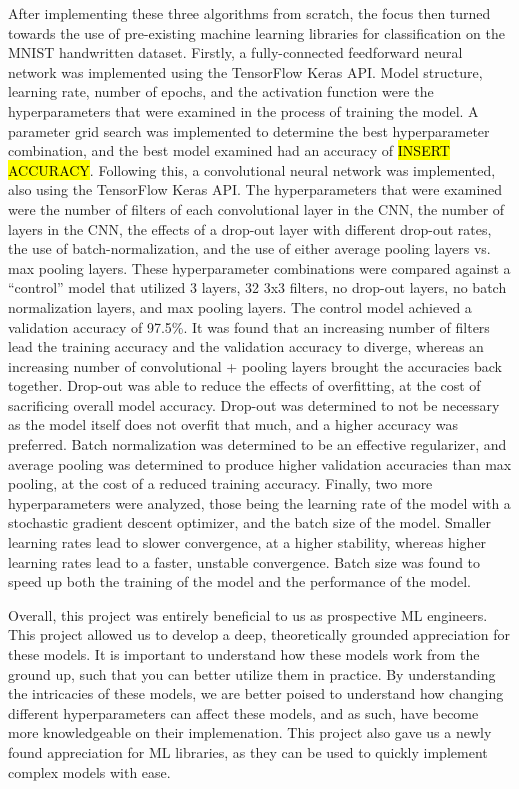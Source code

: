 \documentclass[a4paper]{article}
\begin{document}
After implementing these three algorithms from scratch, the focus then turned towards the use of pre-existing machine learning libraries for classification on the MNIST handwritten dataset. Firstly, a fully-connected feedforward neural network was implemented using the TensorFlow Keras API. Model structure, learning rate, number of epochs, and the activation function were the hyperparameters that were examined in the process of training the model. A parameter grid search was implemented to determine the best hyperparameter combination, and the best model examined had an accuracy of \hl{INSERT ACCURACY}. Following this, a convolutional neural network was implemented, also using the TensorFlow Keras API. The hyperparameters that were examined were the number of filters of each convolutional layer in the CNN, the number of layers in the CNN, the effects of a drop-out layer with different drop-out rates, the use of batch-normalization, and the use of either average pooling layers vs. max pooling layers. These hyperparameter combinations were compared against a ``control'' model that utilized 3 layers, 32 3x3 filters, no drop-out layers, no batch normalization layers, and max pooling layers. The control model achieved a validation accuracy of 97.5\%. It was found that an increasing number of filters lead the training accuracy and the validation accuracy to diverge, whereas an increasing number of convolutional + pooling layers brought the accuracies back together. Drop-out was able to reduce the effects of overfitting, at the cost of sacrificing overall model accuracy. Drop-out was determined to not be necessary as the model itself does not overfit that much, and a higher accuracy was preferred. Batch normalization was determined to be an effective regularizer, and average pooling was determined to produce higher validation accuracies than max pooling, at the cost of a reduced training accuracy. Finally, two more hyperparameters were analyzed, those being the learning rate of the model with a stochastic gradient descent optimizer, and the batch size of the model. Smaller learning rates lead to slower convergence, at a higher stability, whereas higher learning rates lead to a faster, unstable convergence. Batch size was found to speed up both the training of the model and the performance of the model.

Overall, this project was entirely beneficial to us as prospective ML engineers. This project allowed us to develop a deep, theoretically grounded appreciation for these models. It is important to understand how these models work from the ground up, such that you can better utilize them in practice. By understanding the intricacies of these models, we are better poised to understand how changing different hyperparameters can affect these models, and as such, have become more knowledgeable on their implemenation. This project also gave us a newly found appreciation for ML libraries, as they can be used to quickly implement complex models with ease. 
\end{document}
